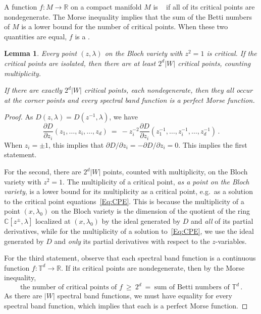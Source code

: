 \documentclass[12pt]{amsart}
\newtheorem{Lemma}[Theorem]{Lemma}
\theoremstyle{remark}
\newcommand{\CC}{{\mathbb C}}
\newcommand{\RR}{{\mathbb R}}
\newcommand{\TT}{{\mathbb T}}
\newcommand{\defcolor}[1]{{\color{blue}#1}}
\newcommand{\demph}[1]{\defcolor{{\sl #1}}}
\begin{document}
A function $f\colon M\to \RR$ on a compact manifold $M$ is \demph{Morse}~\cite{Milnor} if all of its critical points are nondegenerate.
The Morse inequality implies that the sum of the Betti numbers of $M$ is a lower bound for the number of critical points.
When these two quantities are equal,  $f$ is a \demph{perfect Morse function}.


\begin{Lemma}\label{L:minCritPts}
  Every point $(z,\lambda)$ on the Bloch variety with $z^2=1$ is critical.
  If the critical points are isolated, then there are at least $2^d|W|$ critical points, counting multiplicity.

  If there are exactly $2^d|W|$ critical points, each nondegenerate, 
  then  they all occur at the corner points and every spectral band function is a perfect Morse function.
\end{Lemma}
\begin{proof}
  As $D(z,\lambda) = D(z^{-1},\lambda)$, we have
  \[
  \frac{\partial D}{\partial z_i}(z_1,\dots,z_i,\dots, z_d)\ =\
  -z_i^{-2}\frac{\partial D}{\partial z_i}(z_1^{-1},\dots,z_i^{-1},\dots, z_d^{-1})\,.
  \]
  When $z_i = \pm 1$, this implies that $\partial D/\partial z_i=-\partial D/\partial z_i=0$.
  This implies the first statement.

  For the second, there are $2^d|W|$ points, counted with multiplicity, on the Bloch variety with $z^2=1$.
  The multiplicity of a critical point, {\sl as a point on the Bloch variety}, is a lower bound for its multiplicity
  as a critical point,
  e.g.\ as a solution to the critical point equations~\eqref{Eq:CPE}.
  This is because the multiplicity of a point $(x,\lambda_0)$ on the Bloch variety is the dimension of the
  quotient of the ring $\CC[z^{\pm},\lambda]$ localized at $(x,\lambda_0)$ by the
  ideal generated by $D$ and {\sl all} of its partial derivatives, while for the multiplicity of a solution
  to~\eqref{Eq:CPE}, we use the ideal generated by $D$ and
  {\sl only} its partial derivatives with respect to the $z$-variables.

  For the third statement, observe that each spectral band function is a continuous function  $f\colon\TT^d\to\RR$.
  If its critical points are nondegenerate, then by the Morse inequality,
  \[
  \mbox{the number of critical points  of $f$}\ \geq\ 2^d\ =\ \mbox{sum of Betti numbers of $\TT^d$}\,.
  \]
  As there are $|W|$ spectral band functions, we must have equality for every spectral band function, which implies that each
  is a perfect Morse function. 
\end{proof}
\end{document}
